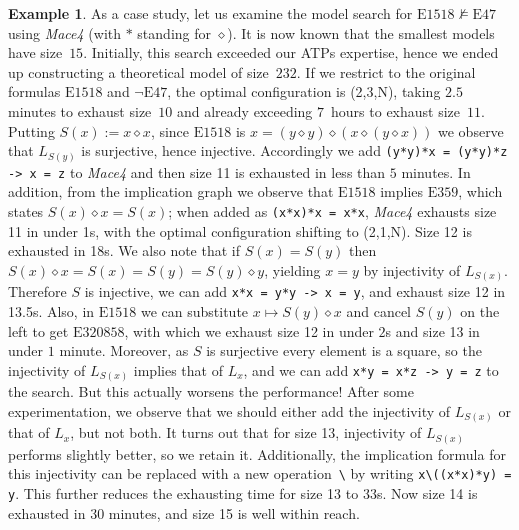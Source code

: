 \documentclass[12pt]{amsart}
\theoremstyle{definition}
\newtheorem{example}[theorem]{Example}
\newcommand{\op}{\diamond}
\newcommand{\nmodels}{\not\models}
\newcommand{\Eq}[1]{\mathrm{E}#1}
\begin{document}
\begin{example}
As a case study, let us examine the model search for $\Eq{1518}\nmodels\Eq{47}$ using \emph{Mace4} (with $*$ standing for $\op$). It is now known that the smallest models have size~$15$. Initially, this search exceeded our ATPs expertise, hence we ended up constructing a theoretical model of size~$232$. If we restrict to the original formulas $\Eq{1518}$ and $\neg\Eq{47}$, the optimal configuration is (2,3,N), taking $2.5$ minutes to exhaust size~$10$ and already exceeding $7$~hours to exhaust size~$11$. Putting $S(x):=x\op x$, since $\Eq{1518}$ is $x = (y \op y) \op  (x \op  (y \op  x))$ we observe that $L_{S(y)}$ is surjective, hence injective. Accordingly we add \verb|(y*y)*x = (y*y)*z -> x = z| to \emph{Mace4} and then size 11 is exhausted in less than $5$ minutes. In addition, from the implication graph we observe that $\Eq{1518}$ implies $\Eq{359}$, which states $S(x) \op x = S(x)$; when added as \verb|(x*x)*x = x*x|, \emph{Mace4} exhausts size 11 in under 1s, with the optimal configuration shifting to (2,1,N). Size 12 is exhausted in 18s. We also note that if $S(x)=S(y)$ then $S(x)\op x = S(x) = S(y) = S(y)\op y$, yielding $x=y$ by injectivity of $L_{S(x)}$. Therefore $S$ is injective, we can add \verb|x*x = y*y -> x = y|, and exhaust size 12 in 13.5s. Also, in $\Eq{1518}$ we can substitute $x\mapsto S(y)\op x$ and cancel $S(y)$ on the left to get $\Eq{320858}$, with which we exhaust size 12 in under $2$s and size 13 in under $1$ minute. Moreover, as $S$ is surjective every element is a square, so the injectivity of $L_{S(x)}$ implies that of $L_x$, and we can add \verb|x*y = x*z -> y = z| to the search. But this actually worsens the performance! After some experimentation, we observe that we should either add the injectivity of $L_{S(x)}$ or that of $L_x$, but not both. It turns out that for size 13, injectivity of $L_{S(x)}$ performs slightly better, so we retain it. Additionally, the implication formula for this injectivity can be replaced with a new operation~\texttt{\textbackslash} by writing \texttt{x\textbackslash((x*x)*y) = y}. This further reduces the exhausting time for size 13 to $33$s. Now size 14 is exhausted in 30 minutes, and size 15 is well within reach.
\end{example}
\end{document}
